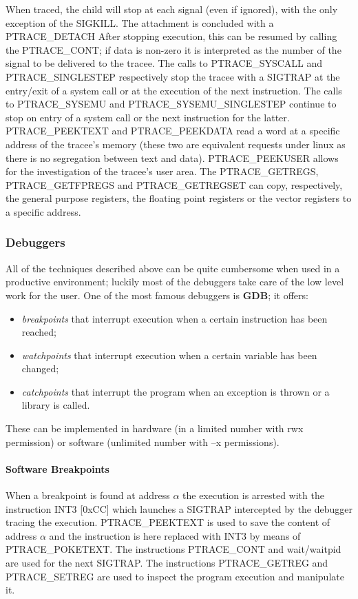 When traced, the child will stop at each signal (even if ignored), with the only exception of the {\ttfamily SIGKILL}.
The attachment is concluded with a {\ttfamily PTRACE\_DETACH}
After stopping execution, this can be resumed by calling the {\ttfamily PTRACE\_CONT}; if data is non-zero it is
interpreted as the number of the signal to be delivered to the tracee.
The calls to {\ttfamily PTRACE\_SYSCALL} and {\ttfamily PTRACE\_SINGLESTEP} respectively stop the tracee with a
{\ttfamily SIGTRAP} at the entry/exit of a system call or at the execution of the next instruction.
The calls to {\ttfamily PTRACE\_SYSEMU} and {\ttfamily PTRACE\_SYSEMU\_SINGLESTEP} continue to stop on entry of a system call or the next instruction for the latter.
{\ttfamily PTRACE\_PEEKTEXT} and {\ttfamily PTRACE\_PEEKDATA} read a word at a specific address of the tracee's memory
(these two are equivalent requests under linux as there is no segregation between text and data). {\ttfamily
PTRACE\_PEEKUSER} allows for the investigation of the tracee's user area.
The {\ttfamily PTRACE\_GETREGS}, {\ttfamily PTRACE\_GETFPREGS} and {\ttfamily PTRACE\_GETREGSET} can copy, respectively,
the general purpose registers, the floating point registers or the vector registers to a specific address.

\subsubsection{Debuggers}
All of the techniques described above can be quite cumbersome when used in a productive environment; luckily most of the
debuggers take care of the low level work for the user. One of the most famous debuggers is \textbf{GDB}; it offers:
\begin{itemize}
    \item \textit{breakpoints} that interrupt execution when a certain instruction has been reached;
    \item \textit{watchpoints} that interrupt execution when a certain variable has been changed;
    \item \textit{catchpoints} that interrupt the program when an exception is thrown or a library is called.
\end{itemize}
These can be implemented in hardware (in a limited number with {\ttfamily rwx} permission) or software (unlimited number
with {\ttfamily --x} permissions).
\paragraph{Software Breakpoints}
When a breakpoint is found at address $\alpha$ the execution is arrested with the instruction {\ttfamily INT3 [0xCC]}
which launches a {\ttfamily SIGTRAP} intercepted by the debugger tracing the execution. {\ttfamily PTRACE\_PEEKTEXT} is
used to save the content of address $\alpha$ and the instruction is here replaced with {\ttfamily INT3} by means of
{\ttfamily PTRACE\_POKETEXT}. The instructions {\ttfamily PTRACE\_CONT} and {\ttfamily wait/waitpid} are used for the
next {\ttfamily SIGTRAP}. The instructions {\ttfamily PTRACE\_GETREG} and {\ttfamily PTRACE\_SETREG} are used to inspect the
program execution and manipulate it.

